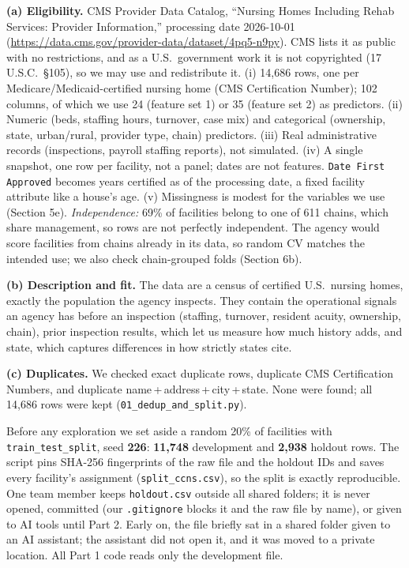 \documentclass[11pt]{article}
\makeatletter
\renewcommand\section{\@startsection{section}{1}{\z@}{-1.6ex \@plus -.5ex \@minus -.2ex}{0.8ex \@plus .2ex}{\normalfont\large\bfseries}}
\makeatother
\begin{document}
\section{Dataset}
\textbf{(a) Eligibility.} CMS Provider Data Catalog, ``Nursing Homes Including Rehab Services: Provider Information,'' processing date 2026-10-01 (\url{https://data.cms.gov/provider-data/dataset/4pq5-n9py}). CMS lists it as public with no restrictions, and as a U.S.\ government work it is not copyrighted (17 U.S.C.\ \S 105), so we may use and redistribute it.
(i) 14{,}686 rows, one per Medicare/Medicaid-certified nursing home (CMS Certification Number); 102 columns, of which we use 24 (feature set 1) or 35 (feature set 2) as predictors.
(ii) Numeric (beds, staffing hours, turnover, case mix) and categorical (ownership, state, urban/rural, provider type, chain) predictors.
(iii) Real administrative records (inspections, payroll staffing reports), not simulated.
(iv) A single snapshot, one row per facility, not a panel; dates are not features. \texttt{Date First Approved} becomes years certified as of the processing date, a fixed facility attribute like a house's age.
(v) Missingness is modest for the variables we use (Section 5e).
\emph{Independence:} 69\% of facilities belong to one of 611 chains, which share management, so rows are not perfectly independent. The agency would score facilities from chains already in its data, so random CV matches the intended use; we also check chain-grouped folds (Section 6b).

\textbf{(b) Description and fit.} The data are a census of certified U.S.\ nursing homes, exactly the population the agency inspects. They contain the operational signals an agency has before an inspection (staffing, turnover, resident acuity, ownership, chain), prior inspection results, which let us measure how much history adds, and state, which captures differences in how strictly states cite.

\textbf{(c) Duplicates.} We checked exact duplicate rows, duplicate CMS Certification Numbers, and duplicate name\,+\,address\,+\,city\,+\,state. None were found; all 14{,}686 rows were kept (\texttt{01\_dedup\_and\_split.py}).

\section{Holdout set}
Before any exploration we set aside a random 20\% of facilities with \texttt{train\_test\_split}, seed \textbf{226}: \textbf{11{,}748} development and \textbf{2{,}938} holdout rows. The script pins SHA-256 fingerprints of the raw file and the holdout IDs and saves every facility's assignment (\texttt{split\_ccns.csv}), so the split is exactly reproducible. One team member keeps \texttt{holdout.csv} outside all shared folders; it is never opened, committed (our \texttt{.gitignore} blocks it and the raw file by name), or given to AI tools until Part 2. Early on, the file briefly sat in a shared folder given to an AI assistant; the assistant did not open it, and it was moved to a private location. All Part 1 code reads only the development file.
\end{document}
